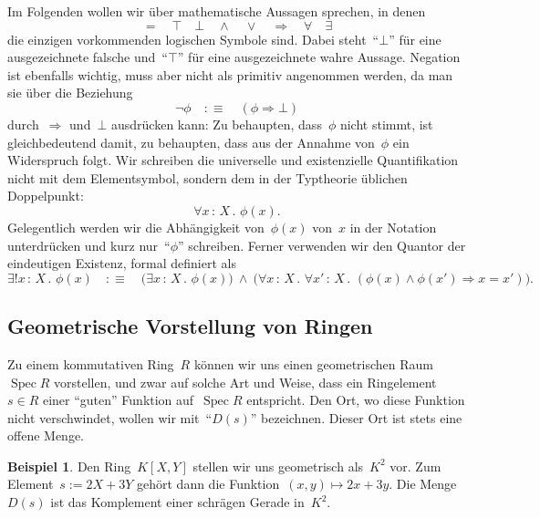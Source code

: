 \documentclass[a4paper,ngerman,12pt]{scrartcl}
\theoremstyle{definition}
\newtheorem{bsp}[defn]{Beispiel}
\theoremstyle{plain}
\theoremstyle{remark}
\DeclareMathOperator{\Spec}{Spec}
\renewcommand{\_}{\mathpunct{.}\,}
\newcommand{\?}{\,{:}\,}
\begin{document}
Im Folgenden wollen wir über mathematische Aussagen sprechen, in denen
\[ {=} \quad {\top} \quad {\bot} \quad {\wedge} \quad {\vee} \quad {\Rightarrow} \quad {\forall} \quad {\exists} \]
die einzigen vorkommenden logischen Symbole sind. Dabei steht~"`$\bot$"' für
eine ausgezeichnete falsche und~"`$\top$"' für eine ausgezeichnete wahre Aussage.
Negation ist ebenfalls wichtig, muss aber nicht als primitiv
angenommen werden, da man sie über die Beziehung
\[ \neg\phi \quad:\equiv\quad (\phi \Rightarrow \bot) \]
durch~$\Rightarrow$ und~$\bot$ ausdrücken kann: Zu behaupten, dass~$\phi$ nicht
stimmt, ist gleichbedeutend damit, zu behaupten, dass aus der Annahme
von~$\phi$ ein Widerspruch folgt.
Wir schreiben die universelle und existenzielle Quantifikation nicht mit dem
Elementsymbol, sondern dem in der Typtheorie üblichen Doppelpunkt:
\[ \forall x\?X\_ \phi(x). \]
Gelegentlich werden wir die Abhängigkeit von~$\phi(x)$ von~$x$ in der Notation
unterdrücken und kurz nur~"`$\phi$"' schreiben. Ferner verwenden wir den
Quantor der eindeutigen Existenz, formal definiert als
\[ \exists! x\?X\_ \phi(x) \quad:\equiv\quad
  \bigl(\exists x\?X\_ \phi(x)\bigr) \ \wedge\ \bigl(\forall x\?X\_ \forall x'\?X\_
  (\phi(x) \wedge \phi(x') \Rightarrow x = x')\bigr). \]


\subsection{Geometrische Vorstellung von Ringen}

Zu einem kommutativen Ring~$R$ können wir uns einen geometrischen Raum~$\Spec
R$ vorstellen, und zwar auf solche Art und Weise, dass ein
Ringelement~$s \in R$ einer "`guten"' Funktion auf~$\Spec R$ entspricht.
Den Ort, wo diese Funktion nicht verschwindet, wollen wir mit~"`$D(s)$"'
bezeichnen. Dieser Ort ist stets eine offene Menge.

\begin{bsp}Den Ring~$K[X,Y]$ stellen wir uns geometrisch als~$K^2$ vor. Zum
Element~$s := 2X+3Y$ gehört dann die Funktion~$(x,y) \mapsto 2x+3y$. Die
Menge~$D(s)$ ist das Komplement einer schrägen Gerade in~$K^2$.\end{bsp}
\end{document}
